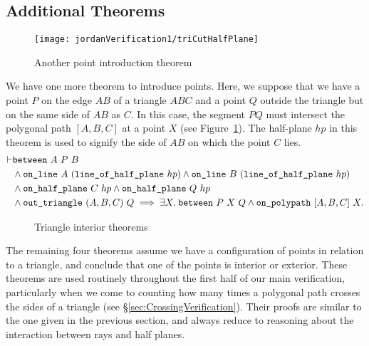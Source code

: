 \subsection{Additional Theorems}\label{sec:AdditionalTheorems}
\begin{figure}
\centering
\texttt{[image: jordanVerification1/triCutHalfPlane]}
\caption{Another point introduction theorem}
\label{fig:triCutHalfPlane}
\end{figure}

We have one more theorem to introduce points. Here, we suppose that we have a point $P$ on the edge $AB$ of a triangle $ABC$ and a point $Q$ outside the triangle but on the same side of $AB$ as $C$. In this case, the segment $PQ$ must intersect the polygonal path $[A,B,C]$ at a point $X$ (see Figure~\ref{fig:triCutHalfPlane}). The half-plane $hp$ in this theorem is used to signify the side of $AB$ on which the point $C$ lies.
\begin{equation}\label{eq:triCutHalfPlane}
\begin{split}
\vdash&\between{A}{P}{B}\\
&\wedge \code{on\_line}\ A\ (\code{line\_of\_half\_plane}\ hp) \wedge \code{on\_line}\ B\ (\code{line\_of\_half\_plane}\ hp)\\
&\wedge \code{on\_half\_plane}\ C\ hp \wedge \code{on\_half\_plane}\ Q\ hp\\
&\wedge \code{out\_triangle}\ (A,B,C)\ Q\implies \exists X.\; \between{P}{X}{Q} \wedge \code{on\_polypath}\ [A,B,C]\ X.
\end{split}
\end{equation}

\begin{figure}
\centering
{}
\qquad{}
\caption{Triangle interior theorems}
\label{fig:inTriangleTheorems}
\end{figure}

The remaining four theorems assume we have a configuration of points in relation to a triangle, and conclude that one of the points is interior or exterior. These theorems are used routinely throughout the first half of our main verification, particularly when we come to counting how many times a polygonal path crosses the sides of a triangle (see \S\ref{sec:CrossingVerification}). Their proofs are similar to the one given in the previous section, and always reduce to reasoning about the interaction between rays and half planes.


